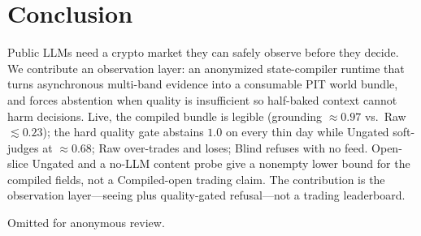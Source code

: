 \documentclass[sigconf,anonymous]{acmart}
\theoremstyle{acmdefinition}%
\theoremstyle{acmplain}%
\begin{document}
\section{Conclusion}
\label{sec:conc}

Public LLMs need a crypto market they can safely observe before they decide. We contribute an observation layer: an anonymized state-compiler runtime that turns asynchronous multi-band evidence into a consumable PIT world bundle, and forces abstention when quality is insufficient so half-baked context cannot harm decisions. Live, the compiled bundle is legible (grounding \({\approx}0.97\) vs.\ Raw \({\lesssim}0.23\)); the hard quality gate abstains \(1.0\) on every thin day while Ungated soft-judges at \({\approx}0.68\); Raw over-trades and loses; Blind refuses with no feed. Open-slice Ungated and a no-LLM content probe give a nonempty lower bound for the compiled fields, not a Compiled-open trading claim. The contribution is the observation layer---seeing plus quality-gated refusal---not a trading leaderboard.

\begin{acks}
Omitted for anonymous review.
\end{acks}



\end{document}
